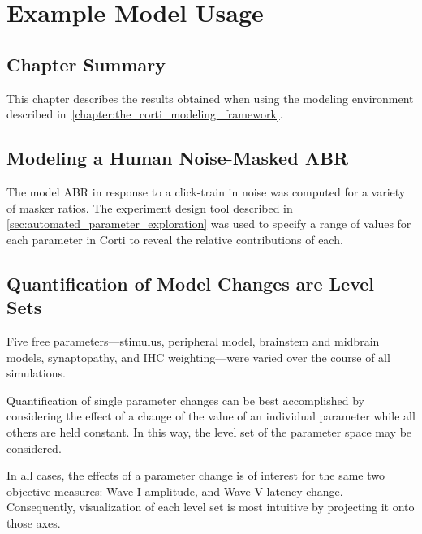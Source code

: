 \chapter{Example Model Usage}
\label{chapter:Results}
\thispagestyle{myheadings}

\graphicspath{{5_Results/Figures/}}
\section{Chapter Summary} %
\label{sec:results_summary}
This chapter describes the results obtained when using the modeling environment described in~\autoref{chapter:the_corti_modeling_framework}.
\section{Modeling a Human Noise-Masked ABR} %
\label{sec:tone_in_noise}
The model ABR in response to a click-train in noise was computed for a variety of masker ratios.   
The experiment design tool described in \autoref{sec:automated_parameter_exploration} was used to specify a range of values for each parameter in Corti to reveal the relative contributions of each. 

\section{Quantification of Model Changes are Level Sets} %
\label{sec:quantification_of_model_changes_are_level_sets}
Five free parameters---stimulus, peripheral model, brainstem and midbrain models, synaptopathy, and IHC weighting---were varied over the course of all simulations. 

Quantification of single parameter changes can be best accomplished by considering the effect of a change of the value of an individual parameter while all others are held constant.  In this way, the level set of the parameter space may be considered. 

In all cases, the effects of a parameter change is of interest for the same two objective measures: Wave I amplitude, and Wave V latency change.   Consequently, visualization of each level set is most intuitive by projecting it onto those axes. 

